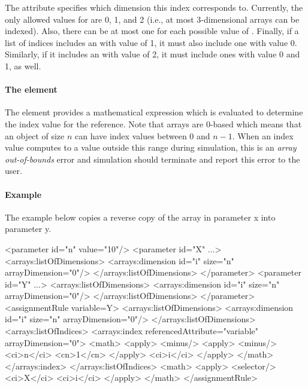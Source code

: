 The  attribute specifies which dimension this index corresponds to.
Currently, the only allowed values for  are 0, 1, and 2 (i.e., at most 3-dimensional arrays can be indexed).  Also, there can be at most one \Index for each possible value of .  Finally, if a list of indices includes an \Index with  value of 1, it must also include one with value 0.  Similarly, if it includes an \Index with  value of 2, it must include ones with value 0 and 1, as well.

\paragraph{The  element}

The  element provides a mathematical expression which is evaluated to determine the index value for the reference.  Note that arrays are 0-based which means that an object of size $n$ can have index values between 0 and $n-1$.  When an index value computes to a value outside this range during simulation, this is an \emph{array out-of-bounds} error and simulation should terminate and report this error to the user.

\paragraph{Example}

The example below copies a reverse copy of the array in parameter x into parameter y.  

\begin{example}
<parameter id="n" value="10"/>
<parameter id="X" ...>
  <arrays:listOfDimensions>
    <arrays:dimension id="i" size="n" arrayDimension="0"/>
  </arrays:listOfDimensions>
</parameter>
<parameter id="Y" ...>
  <arrays:listOfDimensions>
    <arrays:dimension id="i" size="n" arrayDimension="0"/>
  </arrays:listOfDimensions>
</parameter>
<assignmentRule variable=Y>
  <arrays:listOfDimensions>
    <arrays:dimension id="i" size="n" arrayDimension="0"/>
  </arrays:listOfDimensions>
  <arrays:listOfIndices>
    <arrays:index referencedAttribute="variable" arrayDimension="0">
      <math>
        <apply>
          <minus/>
          <apply>
            <minus/>
            <ci>n</ci>
            <cn>1</cn>
          </apply>
          <ci>i</ci>
        </apply>
      </math>
    </arrays:index>
  </arrays:listOfIndices>
  <math>
    <apply>
      <selector/>
      <ci>X</ci>
      <ci>i</ci>
    </apply>
  </math> 
</assignmentRule>
\end{example}

